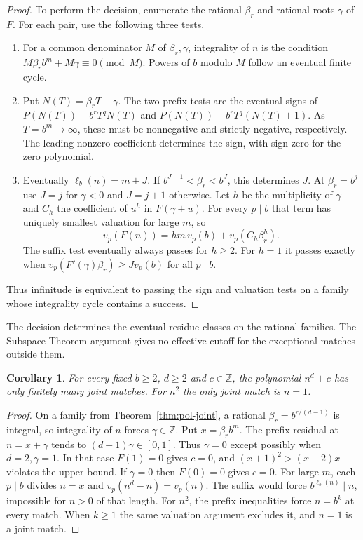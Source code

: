 \documentclass[11pt,reqno,a4paper]{amsart}
\newtheorem{corollary}[theorem]{Corollary}
\theoremstyle{remark}
\begin{document}
\begin{proof}
To perform the decision, enumerate the rational \(\beta_r\)
and rational roots \(\gamma\) of \(F\). For each pair, use
the following three tests.
\begin{enumerate}
\item For a common denominator \(M\) of \(\beta_r,\gamma\),
integrality of \(n\) is the condition
\(M\beta_r b^m+M\gamma\equiv0\pmod M\).
Powers of \(b\) modulo \(M\) follow an eventual finite cycle.
\item Put \(N(T)=\beta_r T+\gamma\). The two prefix tests
are the eventual signs of
\(P(N(T))-b^r T^qN(T)\) and \(P(N(T))-b^r T^q(N(T)+1)\).
As \(T=b^m\to\infty\), these must be nonnegative and
strictly negative, respectively. The leading nonzero
coefficient determines the sign, with sign zero for the
zero polynomial.
\item Eventually \(\ell_b(n)=m+J\). If
\(b^{J-1}<\beta_r<b^J\), this determines \(J\). At
\(\beta_r=b^j\) use \(J=j\) for \(\gamma<0\) and \(J=j+1\)
otherwise. Let \(h\) be the multiplicity of \(\gamma\)
and \(C_h\) the coefficient of \(u^h\) in \(F(\gamma+u)\).
For every \(p\mid b\) that term has uniquely smallest
valuation for large \(m\), so
\[
 v_p(F(n))=hm\,v_p(b)+v_p(C_h\beta_r^h).
\]
The suffix test eventually always passes for \(h\ge2\).
For \(h=1\) it passes exactly when
\(v_p(F'(\gamma)\beta_r)\ge Jv_p(b)\) for all \(p\mid b\).
\end{enumerate}
Thus infinitude is equivalent to passing the sign and
valuation tests on a family whose integrality cycle
contains a success.
\end{proof}

The decision determines the eventual residue classes on
the rational families. The Subspace Theorem argument gives
no effective cutoff for the exceptional matches outside them.

\begin{corollary}\label{cor:pol-joint-powers}
For every fixed \(b\ge2\), \(d\ge2\) and \(c\in\mathbb Z\),
the polynomial \(n^d+c\) has only finitely many joint matches.
For \(n^2\) the only joint match is \(n=1\).
\end{corollary}
\begin{proof}
On a family from Theorem~\ref{thm:pol-joint}, a rational
\(\beta_r=b^{r/(d-1)}\) is integral, so integrality of \(n\)
forces \(\gamma\in\mathbb Z\). Put \(x=\beta_r b^m\).
The prefix residual at \(n=x+\gamma\) tends to
\((d-1)\gamma\in[0,1]\). Thus \(\gamma=0\) except
possibly when \(d=2,\gamma=1\). In that case \(F(1)=0\)
gives \(c=0\), and \((x+1)^2>(x+2)x\) violates the
upper bound. If \(\gamma=0\) then \(F(0)=0\) gives \(c=0\).
For large \(m\), each \(p\mid b\) divides \(n=x\) and
\(v_p(n^d-n)=v_p(n)\). The suffix would force
\(b^{\ell_b(n)}\mid n\), impossible for \(n>0\) of that length.
For \(n^2\), the prefix inequalities force \(n=b^k\)
at every match. When \(k\ge1\) the same valuation argument
excludes it, and \(n=1\) is a joint match.
\end{proof}
\end{document}
